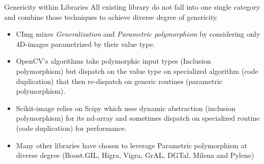 \documentclass[12pt,aspectratio=169]{beamer}
\begin{document}
\begin{frame}[fragile]{Genericity within Libraries}
  All existing library do not fall into one single category and combine those techniques to achieve diverse degree of
  genericity.
  \vspace{-0.2cm}\small\begin{itemize}
    \item CImg mixes \emph{Generalization} and \emph{Parametric polymorphism} by considering only 4D-images parametrized
          by their value type.
    \item OpenCV's algorithms take polymorphic input types (Inclusion polymorphism) but dispatch on the value type on
          specialized algorithm (code duplication) that then re-dispatch on generic routines (parametric polymorphism).
    \item Scikit-image relies on Scipy which uses dynamic abstraction (inclusion polymorphism) for its nd-array and
          sometimes dispatch on specialized routine (code duplication) for performance.
    \item Many other libraries have chosen to leverage Parametric polymorphism at diverse degree (Boost.GIL, Higra,
          Vigra, GrAL, DGTal, Milena and Pylene)
  \end{itemize}
\end{frame}
\end{document}
